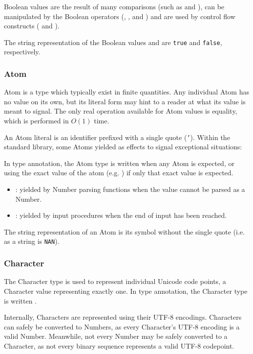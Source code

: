 Boolean values are the result of many comparisons (such as  and
), can be manipulated by the Boolean operators (\op{\&\&}, \op{||},
and \op{!}) and are used by control flow constructs ( and
).

The string representation of the Boolean values
 and  are \texttt{true} and \texttt{false},
respectively.

\subsubsection{Atom}

Atom is a type which typically exist in finite quantities. Any individual
Atom has no value on its own, but its literal form may hint to a reader at
what its value is meant to signal. The only real operation available for
Atom values is equality, which is performed in $O(1)$ time.

An Atom literal is an identifier prefixed with a single quote (\texttt{'}).
Within the standard library, some Atoms yielded as effects to signal
exceptional situations:

In type annotation, the Atom type is written  when any Atom
is expected, or using the exact value of the atom (e.g. ) if
only that exact value is expected.

\begin{itemize}
    \item {}: yielded by Number parsing functions when the value
    cannot be parsed as a Number.
    \item {}: yielded by input procedures when the end of input
    has been reached.
\end{itemize}

The string representation of an Atom is its symbol without the single quote
(i.e.  as a string is \texttt{NAN}).

\subsubsection{Character}

The Character type is used to represent individual Unicode code points,
a Character value representing exactly one.
In type annotation, the Character type is written .

Internally, Characters are represented using their UTF-8 encodings. Characters
can safely be converted to Numbers, as every Character's UTF-8 encoding is a valid
Number. Meanwhile, not every Number may be safely converted to a Character,
as not every binary sequence represents a valid UTF-8 codepoint.

